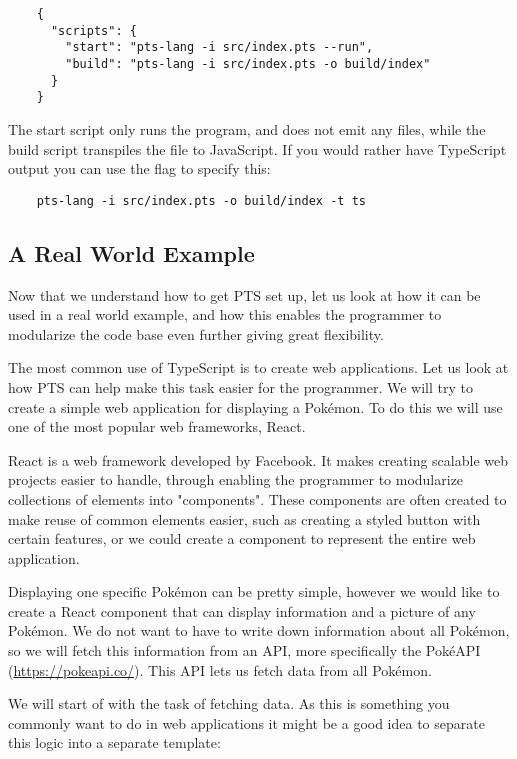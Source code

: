 \begin{verbatim}
    {
      "scripts": {
        "start": "pts-lang -i src/index.pts --run",
        "build": "pts-lang -i src/index.pts -o build/index"
      }
    }
\end{verbatim}

The start script only runs the program, and does not emit any files, while the build script transpiles the  file to JavaScript.
If you would rather have TypeScript output you can use the  flag to specify this:

\begin{verbatim}
    pts-lang -i src/index.pts -o build/index -t ts
\end{verbatim}

\subsection{A Real World Example}\label{subsec:a-real-world-example}

Now that we understand how to get PTS set up, let us look at how it can be used in a real world example, and how this enables the programmer to modularize the code base even further giving great flexibility.

The most common use of TypeScript is to create web applications.
Let us look at how PTS can help make this task easier for the programmer.
We will try to create a simple web application for displaying a Pokémon.
To do this we will use one of the most popular web frameworks, React.

React is a web framework developed by Facebook.
It makes creating scalable web projects easier to handle, through enabling the programmer to modularize collections of elements into "components".
These components are often created to make reuse of common elements easier, such as creating a styled button with certain features, or we could create a component to represent the entire web application.

Displaying one specific Pokémon can be pretty simple, however we would like to create a React component that can display information and a picture of any Pokémon.
We do not want to have to write down information about all Pokémon, so we will fetch this information from an API, more specifically the PokéAPI (\url{https://pokeapi.co/}).
This API lets us fetch data from all Pokémon.

We will start of with the task of fetching data.
As this is something you commonly want to do in web applications it might be a good idea to separate this logic into a separate template:

